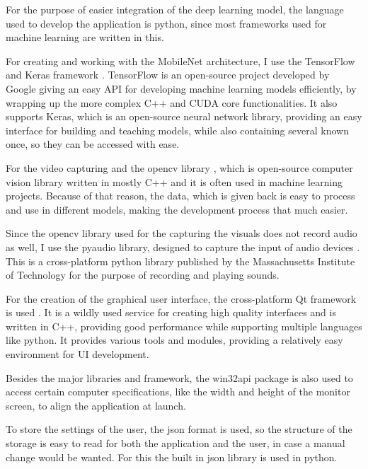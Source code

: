 \par For the purpose of easier integration of the deep learning model, the language used to develop the application is python, since most frameworks used for machine learning are written in this.
\par For creating and working with the MobileNet architecture, I use the TensorFlow \cite{tensorflow2015-whitepaper} and Keras framework \cite{chollet2015keras}. TensorFlow is an open-source project developed by Google giving an easy API for developing machine learning models efficiently, by wrapping up the more complex C++ and CUDA core functionalities. It also supports Keras, which is an open-source neural network library, providing an easy interface for building and teaching models, while also containing several known once, so they can be accessed with ease.
\par For the video capturing and the opencv library \cite{opencv_library}, which is open-source computer vision library written in mostly C++ and it is often used in machine learning projects. Because of that reason, the data, which is given back is easy to process and use in different models, making the development process that much easier.
\par Since the opencv library used for the capturing the visuals does not record audio as well, I use the pyaudio library, designed to capture the input of audio devices \cite{pyaudio}. This is a cross-platform python library published by the Massachusetts Institute of Technology for the purpose of recording and playing sounds. 
\par For the creation of the graphical user interface, the cross-platform Qt framework is used \cite{QtPage}. It is a wildly used service for creating high quality interfaces and is written in C++, providing good performance while supporting multiple languages like python. It provides various tools and modules, providing a relatively easy environment for UI development.
\par Besides the major libraries and framework, the win32api package \cite{win32api} is also used to access certain computer specifications, like the width and height of the monitor screen, to align the application at launch.
\par To store the settings of the user, the json format is used, so the structure of the storage is easy to read for both the application and the user, in case a manual change would be wanted. For this the built in json library \cite{jsonlib} is used in python.